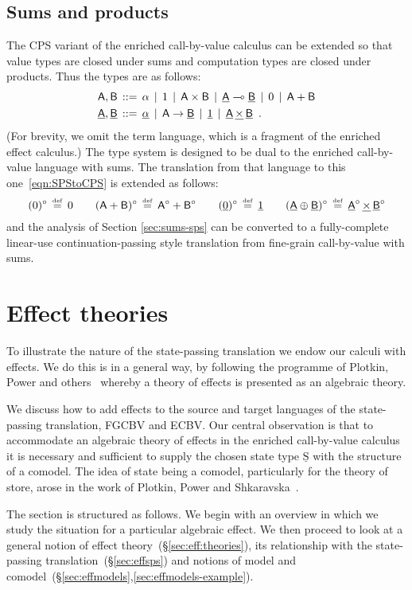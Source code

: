 \documentclass{LMCS}
\newcommand{\EECstate}{\underline{\mathrm{S}}}
\newcommand{\comptype}[1]{\underline{#1}}
\newcommand{\VconstA}{\alpha}
\newcommand{\CconstA}{\comptype{\alpha}}
\newcommand{\VA}{\mathsf{A}}
\newcommand{\VB}{\mathsf{B}}
\newcommand{\CA}{\comptype{\mathsf{A}}}
\newcommand{\CB}{\comptype{\mathsf{B}}}
\newcommand{\lpowertype}[2]{#1\to #2}
\newcommand{\prodtype}{\times}
\newcommand{\Ctimes}{\mathop{\underline{\times}}}
\newcommand{\Cone}{{\underline{1}}}
\newcommand{\algplus}{\oplus}
\newcommand{\defeq}{\mathrel{\,\stackrel{\mbox{\tiny{$\mathrm{def}$}}}=\,}}
\begin{document}
\subsection{Sums and products}
The CPS variant of the enriched call-by-value calculus can be 
extended so that value types are closed under sums and 
computation types are closed under products. 
Thus the types are as follows:
\begin{align*}
\VA,\VB \, & ::= \, \VconstA \,\mid \,1 \,\mid \,\VA \prodtype \VB \, \mid\,  \CA \lpop \CB \,\mid\,0\,\mid\,\VA+\VB \\
\CA,\CB \, & ::= \, \CconstA \,\mid  \,   \lpowertype{\VA}{\CB} 
\,\mid\, \underline 1\,\mid\,\CA\mathop{\underline\times}\CB\enspace .
\end{align*}
(For brevity, we omit the term language, which is a fragment of 
the enriched effect calculus.)
The type system is designed to be dual to the enriched call-by-value language 
with sums. 
The translation from that language to this one~\eqref{eqn:SPStoCPS} 
is extended as follows:
\[(0)^\circ\defeq 0
\qquad
(\VA+\VB)^\circ \defeq \VA^\circ + \VB^\circ
\qquad
(\algzero)^\circ \defeq \Cone
\qquad
(\CA\algplus \CB)^\circ \defeq 
\CA^\circ\Ctimes\CB^\circ
\]
and the analysis
of Section \ref{sec:sums-sps} can be converted to
a fully-complete linear-use continuation-passing style translation
from fine-grain call-by-value with sums.



\section{Effect theories}
\label{sec:modelsoftheories}
To illustrate the nature of the state-passing translation
we endow our calculi with effects.
We do this is in a general way, by following the programme of 
Plotkin, Power and others~\cite{Plotkin:Power:03}
whereby a theory of effects is presented as an algebraic theory.

We discuss how to add effects to the source and target languages of
the state-passing translation, FGCBV and ECBV. Our central observation
is that to accommodate an algebraic theory of effects in the enriched
call-by-value calculus it is necessary and sufficient to supply the
chosen state type $\EECstate$ with the structure of a comodel.  The
idea of state being a comodel, particularly for the theory of store,
arose in the work of Plotkin, Power and
Shkaravska~\cite{Power:Shkaravska:04,Plotkin:Power:08}.

The section is structured as follows. We begin with an overview
in which we study the situation for a particular algebraic effect.
We then proceed to look at a general notion of effect theory~(\S\ref{sec:eff:theories}),
its relationship with the state-passing 
translation~(\S\ref{sec:effsps}) and notions of 
model and comodel~(\S\ref{sec:effmodels},\ref{sec:effmodels-example}).
\end{document}
